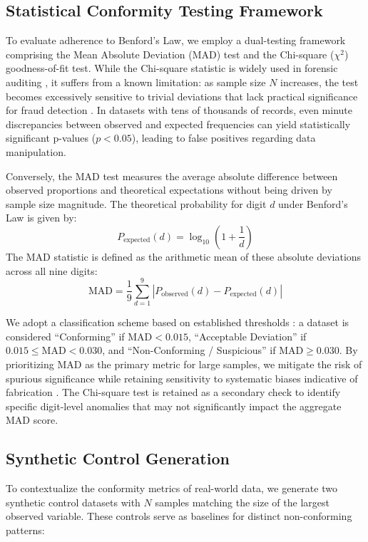 \documentclass[11pt,a4paper]{article}
\begin{document}
\subsection{Statistical Conformity Testing Framework}

To evaluate adherence to Benford's Law, we employ a dual-testing framework comprising the Mean Absolute Deviation (MAD) test and the Chi-square ($\chi^2$) goodness-of-fit test. While the Chi-square statistic is widely used in forensic auditing \cite{Azevedo2021ABL}, it suffers from a known limitation: as sample size $N$ increases, the test becomes excessively sensitive to trivial deviations that lack practical significance for fraud detection \cite{Kossovsky2021OnTM}. In datasets with tens of thousands of records, even minute discrepancies between observed and expected frequencies can yield statistically significant p-values ($p < 0.05$), leading to false positives regarding data manipulation.

Conversely, the MAD test measures the average absolute difference between observed proportions and theoretical expectations without being driven by sample size magnitude. The theoretical probability for digit $d$ under Benford's Law is given by:
$$ P_{\text{expected}}(d) = \log_{10}\left(1 + \frac{1}{d}\right) $$
The MAD statistic is defined as the arithmetic mean of these absolute deviations across all nine digits:
$$ \text{MAD} = \frac{1}{9} \sum_{d=1}^{9} |P_{\text{observed}}(d) - P_{\text{expected}}(d)| $$

We adopt a classification scheme based on established thresholds \cite{Durtschi2004TheEU}: a dataset is considered ``Conforming'' if $\text{MAD} < 0.015$, ``Acceptable Deviation'' if $0.015 \leq \text{MAD} < 0.030$, and ``Non-Conforming / Suspicious'' if $\text{MAD} \geq 0.030$. By prioritizing MAD as the primary metric for large samples, we mitigate the risk of spurious significance while retaining sensitivity to systematic biases indicative of fabrication \cite{Petras2025DetectingBL}. The Chi-square test is retained as a secondary check to identify specific digit-level anomalies that may not significantly impact the aggregate MAD score.

\subsection{Synthetic Control Generation}

To contextualize the conformity metrics of real-world data, we generate two synthetic control datasets with $N$ samples matching the size of the largest observed variable. These controls serve as baselines for distinct non-conforming patterns:
\end{document}
